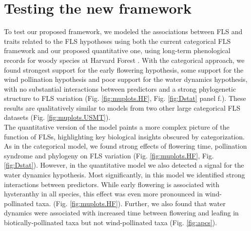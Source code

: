\documentclass[12pt]{article}
\begin{document}
\section*{Testing the new framework}

To test our proposed framework, we modeled the associations between FLS and traits related to the FLS hypotheses using both the current categorical FLS framework and our proposed quantitative one, using long-term phenological records for woody species at Harvard Forest \citep{OKeefe2015}. With the categorical approach, we found strongest support for the early flowering hypothesis, some support for the wind pollination hypothesis and poor support for the water dynamics hypothesis, with no substantial interactions between predictors and a strong phylogenetic structure to FLS variation (Fig. \ref{fig:muplots.HF}, Fig.  \ref{fig:Dstat} panel f.). These results are qualitatively similar to models from two other large categorical FLS datasets (Fig. \ref{fig:muplots.USMT}). \\

\noindent The quantitative version of the model paints a more complex picture of the function of FLSs, highlighting key biological insights obscured by categorization. As in the categorical model, we found strong effects of flowering time, pollination syndrome and phylogeny on FLS variation (Fig. \ref{fig:muplots.HF}, Fig. \ref{fig:Dstat}). However, in the quantitative model we also detected a signal for the water dynamics hypothesis. %
Most significantly, in this model we identified strong interactions between predictors. While early flowering is associated with hysteranthy in all species, this effect was even more pronounced in wind-pollinated taxa. (Fig. \ref{fig:muplots.HF}). Further, we also found that water dynamics were associated with increased time between flowering and leafing in biotically-pollinated taxa but not wind-pollinated taxa (Fig. \ref{fig:apcs}). \\ 
\end{document}
